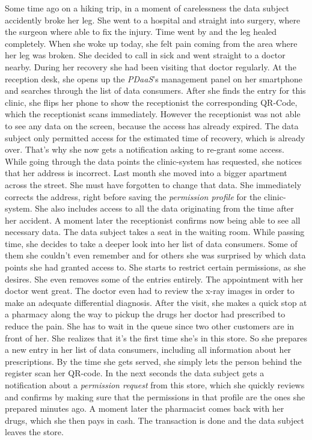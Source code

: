 \documentclass[12pt,english,a4paper,titlepage,cleardoublepage=empty,dottedtoc]{report}
\begin{document}
Some time ago on a hiking trip, in a moment of carelessness the data
subject accidently broke her leg. She went to a hospital and straight
into surgery, where the surgeon where able to fix the injury. Time went
by and the leg healed completely. When she woke up today, she felt pain
coming from the area where her leg was broken. She decided to call in
sick and went straight to a doctor nearby. During her recovery she had
been visiting that doctor regularly. At the reception desk, she opens up
the \emph{PDaaS}'s management panel on her smartphone and searches
through the list of data consumers. After she finds the entry for this
clinic, she flips her phone to show the receptionist the corresponding
QR-Code, which the receptionist scans immediately. However the
receptionist was not able to see any data on the screen, because the
access has already expired. The data subject only permitted access for
the estimated time of recovery, which is already over. That's why she
now gets a notification asking to re-grant some access. While going
through the data points the clinic-system has requested, she notices
that her address is incorrect. Last month she moved into a bigger
apartment across the street. She must have forgotten to change that
data. She immediately corrects the address, right before saving the
\emph{permission profile} for the clinic-system. She also includes
access to all the data originating from the time after her accident. A
moment later the receptionist confirms now being able to see all
necessary data. The data subject takes a seat in the waiting room. While
passing time, she decides to take a deeper look into her list of data
consumers. Some of them she couldn't even remember and for others she
was surprised by which data points she had granted access to. She starts
to restrict certain permissions, as she desires. She even removes some
of the entries entirely. The appointment with her doctor went great. The
doctor even had to review the x-ray images in order to make an adequate
differential diagnosis. After the visit, she makes a quick stop at a
pharmacy along the way to pickup the drugs her doctor had prescribed to
reduce the pain. She has to wait in the queue since two other customers
are in front of her. She realizes that it's the first time she's in this
store. So she prepares a new entry in her list of data consumers,
including all information about her prescriptions. By the time she gets
served, she simply lets the person behind the register scan her QR-code.
In the next seconds the data subject gets a notification about a
\emph{permission request} from this store, which she quickly reviews and
confirms by making sure that the permissions in that profile are the
ones she prepared minutes ago. A moment later the pharmacist comes back
with her drugs, which she then pays in cash. The transaction is done and
the data subject leaves the store.
\end{document}
